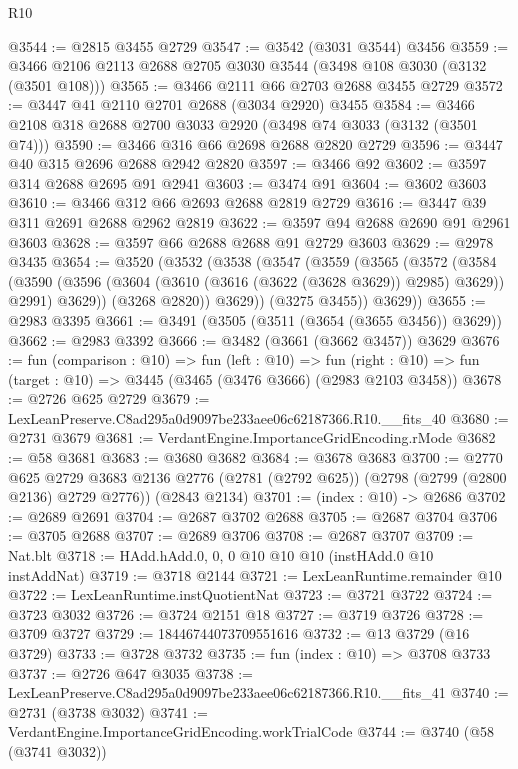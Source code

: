 \begin{lexlean}{R10}
\begin{coremodule}
@3544 := @2815 @3455 @2729
@3547 := @3542 (@3031 @3544) @3456
@3559 := @3466 @2106 @2113 @2688 @2705 @3030 @3544 (@3498 @108 @3030 (@3132 (@3501 @108)))
@3565 := @3466 @2111 @66 @2703 @2688 @3455 @2729
@3572 := @3447 @41 @2110 @2701 @2688 (@3034 @2920) @3455
@3584 := @3466 @2108 @318 @2688 @2700 @3033 @2920 (@3498 @74 @3033 (@3132 (@3501 @74)))
@3590 := @3466 @316 @66 @2698 @2688 @2820 @2729
@3596 := @3447 @40 @315 @2696 @2688 @2942 @2820
@3597 := @3466 @92
@3602 := @3597 @314 @2688 @2695 @91 @2941
@3603 := @3474 @91
@3604 := @3602 @3603
@3610 := @3466 @312 @66 @2693 @2688 @2819 @2729
@3616 := @3447 @39 @311 @2691 @2688 @2962 @2819
@3622 := @3597 @94 @2688 @2690 @91 @2961 @3603
@3628 := @3597 @66 @2688 @2688 @91 @2729 @3603
@3629 := @2978 @3435
@3654 := @3520
    (@3532
      (@3538
        (@3547
          (@3559
            (@3565
              (@3572
                (@3584
                  (@3590
                    (@3596 (@3604 (@3610 (@3616 (@3622 (@3628 @3629)) @2985) @3629)) @2991)
                    @3629))
                (@3268 @2820))
              @3629))
          (@3275 @3455))
        @3629))
@3655 := @2983 @3395
@3661 := @3491 (@3505 (@3511 (@3654 (@3655 @3456)) @3629))
@3662 := @2983 @3392
@3666 := @3482 (@3661 (@3662 @3457)) @3629
@3676 := fun (comparison : @10) =>
  fun (left : @10) =>
  fun (right : @10) => fun (target : @10) => @3445 (@3465 (@3476 @3666) (@2983 @2103 @3458))
@3678 := @2726 @625 @2729
@3679 := LexLeanPreserve.C8ad295a0d9097be233aee06c62187366.R10.__fits_40
@3680 := @2731 @3679
@3681 := VerdantEngine.ImportanceGridEncoding.rMode
@3682 := @58 @3681
@3683 := @3680 @3682
@3684 := @3678 @3683
@3700 := @2770
    @625
    @2729
    @3683
    @2136
    @2776
    (@2781 (@2792 @625))
    (@2798 (@2799 (@2800 @2136) @2729 @2776))
    (@2843 @2134)
@3701 := (index : @10) -> @2686
@3702 := @2689 @2691
@3704 := @2687 @3702 @2688
@3705 := @2687 @3704
@3706 := @3705 @2688
@3707 := @2689 @3706
@3708 := @2687 @3707
@3709 := Nat.blt
@3718 := HAdd.hAdd.{0, 0, 0} @10 @10 @10 (instHAdd.{0} @10 instAddNat)
@3719 := @3718 @2144
@3721 := LexLeanRuntime.remainder @10
@3722 := LexLeanRuntime.instQuotientNat
@3723 := @3721 @3722
@3724 := @3723 @3032
@3726 := @3724 @2151 @18
@3727 := @3719 @3726
@3728 := @3709 @3727
@3729 := 18446744073709551616
@3732 := @13 @3729 (@16 @3729)
@3733 := @3728 @3732
@3735 := fun (index : @10) => @3708 @3733
@3737 := @2726 @647 @3035
@3738 := LexLeanPreserve.C8ad295a0d9097be233aee06c62187366.R10.__fits_41
@3740 := @2731 (@3738 @3032)
@3741 := VerdantEngine.ImportanceGridEncoding.workTrialCode
@3744 := @3740 (@58 (@3741 @3032))

\end{coremodule}
\end{lexlean}
